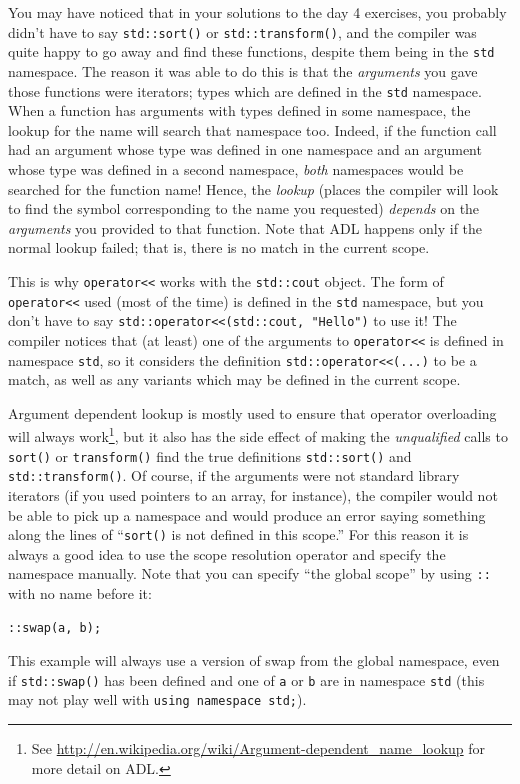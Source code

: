\documentclass[a4paper]{scrartcl}
\begin{document}
You may have noticed that in your solutions to the day 4 exercises, you probably didn't have to say \verb|std::sort()| or \verb|std::transform()|, and the compiler was quite happy to go away and find these functions, despite them being in the \verb|std| namespace. The reason it was able to do this is that the \emph{arguments} you gave those functions were iterators; types which are defined in the \verb|std| namespace. When a function has arguments with types defined in some namespace, the lookup for the name will search that namespace too. Indeed, if the function call had an argument whose type was defined in one namespace and an argument whose type was defined in a second namespace, \emph{both} namespaces would be searched for the function name! Hence, the \emph{lookup} (places the compiler will look to find the symbol corresponding to the name you requested) \emph{depends} on the \emph{arguments} you provided to that function. Note that ADL happens only if the normal lookup failed; that is, there is no match in the current scope.

This is why \verb|operator<<| works with the \verb|std::cout| object. The form of \verb|operator<<| used (most of the time) is defined in the \verb|std| namespace, but you don't have to say \verb|std::operator<<(std::cout, "Hello")| to use it! The compiler notices that (at least) one of the arguments to \verb|operator<<| is defined in namespace \verb|std|, so it considers the definition \verb|std::operator<<(...)| to be a match, as well as any variants which may be defined in the current scope.

Argument dependent lookup is mostly used to ensure that operator overloading will always work\footnote{See \url{http://en.wikipedia.org/wiki/Argument-dependent_name_lookup} for more detail on ADL.}, but it also has the side effect of making the \emph{unqualified} calls to \verb|sort()| or \verb|transform()| find the true definitions \verb|std::sort()| and \verb|std::transform()|. Of course, if the arguments were not standard library iterators (if you used pointers to an array, for instance), the compiler would not be able to pick up a namespace and would produce an error saying something along the lines of ``\verb|sort()| is not defined in this scope.'' For this reason it is always a good idea to use the scope resolution operator and specify the namespace manually. Note that you can specify ``the global scope'' by using \verb|::| with no name before it:
\begin{verbatim}
::swap(a, b);
\end{verbatim}
This example will always use a version of swap from the global namespace, even if \verb|std::swap()| has been defined and one of \verb|a| or \verb|b| are in namespace \verb|std| (this may not play well with \texttt{using namespace std;}).
\end{document}

